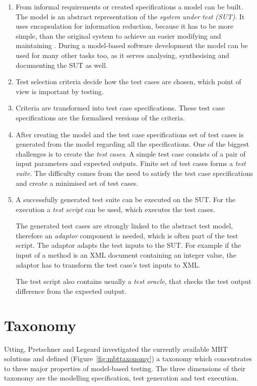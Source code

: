 \begin{enumerate}
    \item From informal requirements or created specifications a model can be built. The model is an abstract representation of the \textit{system under test (SUT)}. It uses encapsulation for information reduction, because it has to be more simple, than the original system to achieve an easier modifying and maintaining \cite{mbttestcasegeneration}. During a model-based software development the model can be used for many other tasks too, as it serves analysing, synthesising and documenting the SUT as well.
     \item Test selection criteria decide how the test cases are chosen, which point of view is important by testing.
     \item Criteria are transformed into test case specifications. These test case specifications are the formalised versions of the criteria.
     \item After creating the model and the test case specifications set of test cases is generated from the model regarding all the specifications. One of the biggest challenges is to create the \textit{test cases}. A simple test case consists of a pair of input parameters and expected outputs. Finite set of test cases forms a \textit{test suite}. The difficulty comes from the need to satisfy the test case specifications and create a minimised set of test cases.
     \item A successfully generated test suite can be executed on the SUT. For the execution a \textit{test script} can be used, which executes the test cases.
     
     The generated test cases are strongly linked to the abstract test model, therefore an \textit{adaptor} component is needed, which is often part of the test script. The adaptor adapts the test inputs to the SUT. For example if the input of a method is an XML document containing an integer value, the adaptor has to transform the test case's test inputs to XML.
     
     The test script also contains usually a \textit{test oracle}, that checks the test output difference from the expected output.
\end{enumerate}

\section{Taxonomy}
\label{sec:taxonomy}

Utting, Pretschner and Legeard investigated the currently available MBT solutions and defined (Figure~\ref{fig:mbttaxonomy}) a taxonomy which concentrates to three major properties of model-based testing. The three dimensions of their taxonomy are the modelling specification, test generation and test execution.

